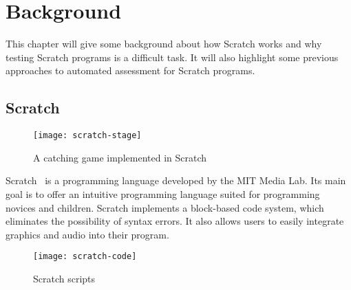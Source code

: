 
\chapter{Background}%
\label{cha:background}

This chapter will give some background about how Scratch works and why testing Scratch programs is a difficult task.
It will also highlight some previous approaches to automated assessment for Scratch programs.

\section{Scratch}%
\label{sec:scratch}


\begin{wrapfigure}{r}{0.30\textwidth + 5mm}
    \vspace{-3mm}
    \centering
    \texttt{[image: scratch-stage]}
    \caption{A catching game implemented in Scratch}
    \label{fig:a_catching_game_implemented_in_scratch}
    \vspace{-6mm}
\end{wrapfigure}

Scratch~\cite{scratch} is a programming language developed by the MIT Media Lab.
Its main goal is to offer an intuitive programming language suited for programming novices and children.
Scratch implements a block-based code system, which eliminates the possibility of syntax errors.
It also allows users to easily integrate graphics and audio into their program.
\parspace

\begin{wrapfigure}{r}{0.40\textwidth + 5mm}
    \vspace{-3mm}
    \centering
    \texttt{[image: scratch-code]}
    \caption{Scratch scripts}
    \label{fig:scratch_blocks}
    \vspace{-3mm}
\end{wrapfigure}

